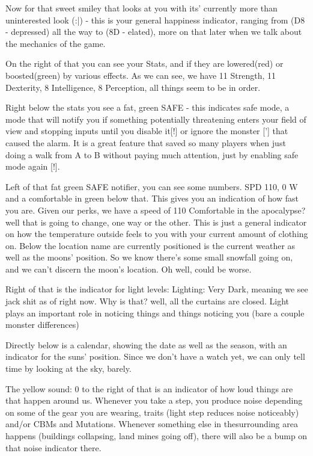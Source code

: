 \documentclass[11pt]{report}
\begin{document}
Now for that sweet smiley that looks at you with its' currently more than uninterested look (:|) - this is your general happiness indicator, ranging from (D8 - depressed) all the way to (8D - elated), more on that later when we talk about the mechanics of the game.

On the right of that you can see your Stats, and if they are lowered(red) or boosted(green) by various effects. As we can see, we have 11 Strength, 11 Dexterity, 8 Intelligence, 8 Perception, all things seem to be in order.

Right below the stats you see a fat, green SAFE - this indicates safe mode, a mode that will notify you if something potentially threatening enters your field of view and stopping inputs until you disable it[!] or ignore the monster ['] that caused the alarm. It is a great feature that saved so many players when just doing a walk from A to B without paying much attention, just by enabling safe mode again [!].

Left of that fat green SAFE notifier, you can see some numbers. SPD 110, 0 W and a comfortable in green below that. This gives you an indication of how fast you are. Given our perks, we have a speed of 110%
Comfortable in the apocalypse? well that is going to change, one way or the other. This is just a general indicator on how the temperature outside feels to you with your current amount of clothing on.
Below the location name are currently positioned is the current weather as well as the moons' position. So we know there's some small snowfall going on, and we can't discern the moon's location. Oh well, could be worse.

Right of that is the indicator for light levels: Lighting: Very Dark, meaning we see jack shit as of right now. Why is that? well, all the curtains are closed. Light plays an important role in noticing things and things noticing you (bare a couple monster differences)

Directly below is a calendar, showing the date as well as the season, with an indicator for the suns' position. Since we don't have a watch yet, we can only tell time by looking at the sky, barely.

The yellow sound: 0 to the right of that is an indicator of how loud things are that happen around us. Whenever you take a step, you produce noise depending on some of the gear you are wearing, traits (light step reduces noise noticeably) and/or CBMs and Mutations. Whenever something else in thesurrounding area happens (buildings collapsing, land mines going off), there will also be a bump on that noise indicator there.
\end{document}
